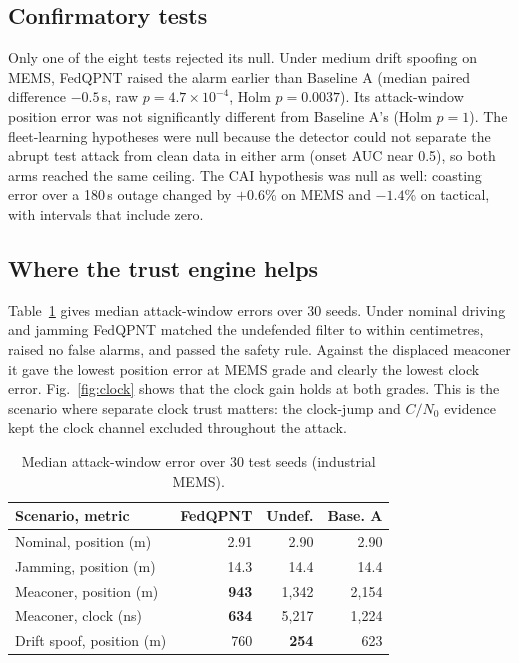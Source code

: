 \documentclass[conference]{IEEEtran}
\begin{document}
\subsection{Confirmatory tests}
Only one of the eight tests rejected its null. Under medium drift spoofing on MEMS, FedQPNT raised the alarm earlier than Baseline A (median paired difference $-0.5$\,s, raw $p=4.7\times10^{-4}$, Holm $p=0.0037$). Its attack-window position error was not significantly different from Baseline A's (Holm $p=1$). The fleet-learning hypotheses were null because the detector could not separate the abrupt test attack from clean data in either arm (onset AUC near 0.5), so both arms reached the same ceiling. The CAI hypothesis was null as well: coasting error over a 180\,s outage changed by $+0.6$\% on MEMS and $-1.4$\% on tactical, with intervals that include zero.

\subsection{Where the trust engine helps}
Table~\ref{tab:head} gives median attack-window errors over 30 seeds. Under nominal driving and jamming FedQPNT matched the undefended filter to within centimetres, raised no false alarms, and passed the safety rule. Against the displaced meaconer it gave the lowest position error at MEMS grade and clearly the lowest clock error. Fig.~\ref{fig:clock} shows that the clock gain holds at both grades. This is the scenario where separate clock trust matters: the clock-jump and $C/N_0$ evidence kept the clock channel excluded throughout the attack.

\begin{table}[t]
\centering
\caption{Median attack-window error over 30 test seeds (industrial MEMS).}
\label{tab:head}
\begin{tabular}{lrrr}
\toprule
Scenario, metric & FedQPNT & Undef. & Base. A \\
\midrule
Nominal, position (m) & 2.91 & 2.90 & 2.90 \\
Jamming, position (m) & 14.3 & 14.4 & 14.4 \\
Meaconer, position (m) & \textbf{943} & 1{,}342 & 2{,}154 \\
Meaconer, clock (ns) & \textbf{634} & 5{,}217 & 1{,}224 \\
Drift spoof, position (m) & 760 & \textbf{254} & 623 \\
\bottomrule
\end{tabular}
\end{table}
\end{document}
